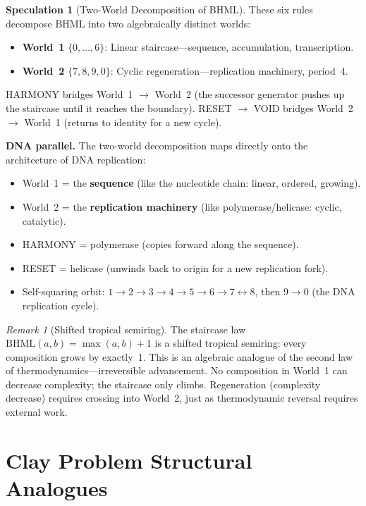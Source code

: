 \documentclass[11pt]{article}
\theoremstyle{definition}
\newtheorem{speculation}[theorem]{Speculation}
\theoremstyle{remark}
\newtheorem{remark}[theorem]{Remark}
\begin{document}
\begin{speculation}[Two-World Decomposition of BHML]
\label{spec:two-worlds}
These six rules decompose BHML into two algebraically distinct worlds:
\begin{itemize}[nosep]
  \item \textbf{World~1} $\{0, \ldots, 6\}$: Linear staircase---sequence,
    accumulation, transcription.
  \item \textbf{World~2} $\{7, 8, 9, 0\}$: Cyclic regeneration---replication
    machinery, period~4.
\end{itemize}
HARMONY bridges World~1 $\to$ World~2 (the successor generator pushes up the
staircase until it reaches the boundary).  RESET $\to$ VOID bridges
World~2 $\to$ World~1 (returns to identity for a new cycle).
\end{speculation}

\textbf{DNA parallel.}
The two-world decomposition maps directly onto the architecture of DNA
replication:
\begin{itemize}[nosep]
  \item World~1 = the \textbf{sequence} (like the nucleotide chain: linear,
    ordered, growing).
  \item World~2 = the \textbf{replication machinery} (like polymerase/helicase:
    cyclic, catalytic).
  \item HARMONY = polymerase (copies forward along the sequence).
  \item RESET = helicase (unwinds back to origin for a new replication fork).
  \item Self-squaring orbit: $1 \to 2 \to 3 \to 4 \to 5 \to 6 \to 7
    \leftrightarrow 8$, then $9 \to 0$ (the DNA replication cycle).
\end{itemize}

\begin{remark}[Shifted tropical semiring]
The staircase law $\text{BHML}(a,b) = \max(a,b) + 1$ is a shifted tropical
semiring: every composition grows by exactly~1.  This is an algebraic analogue
of the second law of thermodynamics---irreversible advancement.  No composition
in World~1 can decrease complexity; the staircase only climbs.  Regeneration
(complexity decrease) requires crossing into World~2, just as thermodynamic
reversal requires external work.
\end{remark}

\section{Clay Problem Structural Analogues}
\label{sec:clay-analogues}
\end{document}
